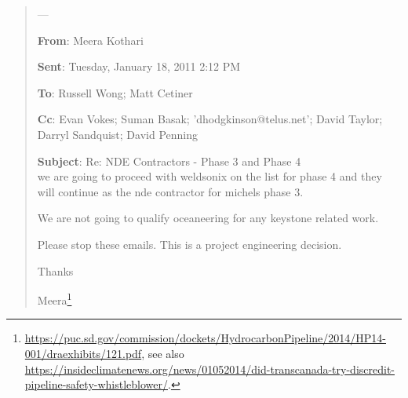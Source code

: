 \documentclass{article}
\begin{document}
\begin{quote}
		 ---

		\textbf{From}: Meera Kothari

		\textbf{Sent}: Tuesday, January 18, 2011 2:12 PM

		\textbf{To}: Russell Wong; Matt Cetiner

		\textbf{Cc}: Evan Vokes; Suman Basak; 'dhodgkinson@telus.net'; David Taylor; Darryl Sandquist; David Penning

		\textbf{Subject}: Re: NDE Contractors - Phase 3 and Phase 4\\

		we are going to proceed with weldsonix on the list for phase 4 and they will continue as the nde contractor for michels phase 3. 

		We are not going to qualify oceaneering for any keystone related work. 

		Please stop these emails. This is a project engineering decision. 

		Thanks 

		Meera\footnote{\url{https://puc.sd.gov/commission/dockets/HydrocarbonPipeline/2014/HP14-001/draexhibits/121.pdf}, see also \url{https://insideclimatenews.org/news/01052014/did-transcanada-try-discredit-pipeline-safety-whistleblower/}.} 
	\end{quote}






	\clearpage
	\printbibliography
\end{document}
